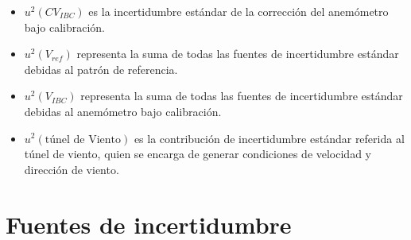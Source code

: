 \begin{itemize}
    \item $u^{2}(CV_{IBC})$ es la incertidumbre estándar de la corrección del anemómetro bajo calibración.
    \item $u^{2}(V_{ref})$ representa la suma de todas las fuentes de incertidumbre estándar debidas al patrón de referencia.
    \item $u^{2}(V_{IBC})$ representa la suma de todas las fuentes de incertidumbre estándar debidas al anemómetro bajo calibración.
    \item $u^{2}(\text{túnel de Viento})$ es la contribución de incertidumbre estándar referida al túnel de viento, quien se encarga de generar condiciones de velocidad y dirección de viento.
\end{itemize}
\section{Fuentes de incertidumbre}\label{sec:fuentesDeIncertidumbre}
\newcommand{\descCalibracion}{Incertidumbre expandida especificada  en el certificado de calibración.}
\newcommand{\descAjusteCalibracion}{Desvío estándar del ajuste lineal con los datos discretos del certificado de calibración.}
\newcommand{\descResolucionInstrumento}{Mínima diferencia entre valores indicados por el instrumento bajo calibración a través de su sistema de adquisición o lectura de datos.}
\newcommand{\descResolucionPatron}{Solo se debe agregar en caso de utilizar un sistema de lectura o adquisición distinto al que fue calibrado.}
\newcommand{\descRepetibilidad}{Desvío estándar de la media aritmética de las mediciones.}
\newcommand{\descHisteresis}{Diferencia entre los valores de mediciones realizadas en los ciclos ascendente y descendente.}
\newcommand{\descFactorBloqueo}{Incertidumbre asociada al factor de bloqueo que se define como la relación entre el área transversal del túnel de viento y el área efectiva del anemómetro, proyectada en el plano transversal.}
\newcommand{\descHomogeneidad}{Variación espacial del flujo de aire dentro del túnel.}
\newcommand{\descAjusteHomogeneidad}{Desvío estándar del ajuste lineal con los datos discretos del certificado de homogeneidad.}
\newcommand{\descEstabilidad}{Variación temporal del flujo de aire dentro del túnel.}
\newcommand{\descAjusteEstabilidad}{Desvío estándar del ajuste lineal con los datos discretos del certificado de estabilidad.}
\newcommand{\descFactorCalib}{Incertidumbre asociada al factor de calibracion que proporciona la relación entre las condiciones en la posición de medición de referencia y las condiciones en la posición del IBC.}


